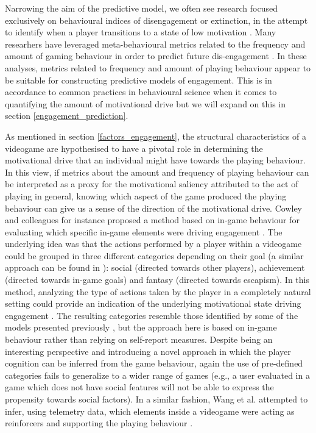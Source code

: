 Narrowing the aim of the predictive model, we often see research focused exclusively on behavioural indices of disengagement or extinction, in the attempt to identify when a player transitions to a state of low motivation \cite{el2021game}. Many researhers have leveraged meta-behavioural metrics related to the frequency and amount of gaming behaviour in order to predict future dis-engagement \cite{runge2014churn, kim2017churn, hadiji2014predicting}. In these analyses, metrics related to frequency and amount of playing behaviour appear to be suitable for constructing predictive models of engagement. This is in accordance to common practices in behavioural science when it comes to quantifying the amount of motivational drive \cite{cacioppo2007handbook} but we will expand on this in section \ref{engagement_prediction}. 

As mentioned in section \ref{factors_engagement}, the structural characteristics of a videogame are hypothesised to have a pivotal role in determining the motivational drive that an individual might have towards the playing behaviour. In this view, if metrics about the amount and frequency of playing behaviour can be interpreted as a proxy for the motivational saliency attributed to the act of playing in general, knowing which aspect of the game produced the playing behaviour can give us a sense of the direction of the motivational drive. Cowley and colleagues for instance proposed a method based on in-game behaviour for evaluating which specific in-game elements were driving engagement \cite{cowley2016behavlets}. The underlying idea was that the actions performed by a player within a videogame could be grouped in three different categories depending on their goal (a similar approach can be found in \cite{bartle1996hearts}): social (directed towards other players), achievement (directed towards in-game goals) and fantasy (directed towards escapism). In this method, analyzing the type of actions taken by the player in a completely natural setting could provide an indication of the underlying motivational state driving engagement \cite{cowley2016behavlets}. The resulting categories resemble those identified by some of the models  presented previously \cite{yee2006motivations, bartle1996hearts}, but the approach here is based on in-game behaviour rather than relying on self-report measures. Despite being an interesting perspective and introducing a novel approach in which the player cognition can be inferred from the game behaviour, again the use of pre-defined categories fails to generalize to a wider range of games (e.g., a user evaluated in a game which does not have social features will not be able to express the propensity towards social factors). In a similar fashion, Wang et al. attempted to infer, using telemetry data, which elements inside a videogame were acting as reinforcers and supporting the playing behaviour \cite{wang2018beyond}. 

